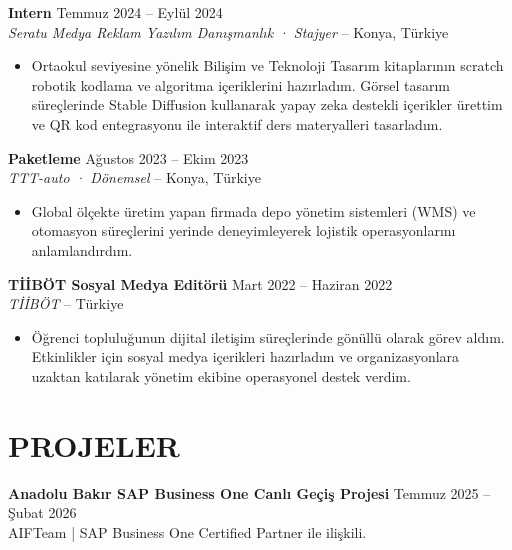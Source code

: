 \documentclass[a4paper,8pt]{article}
\begin{document}
\vspace{3pt}

\textbf{Intern} \hfill {\small Temmuz 2024 -- Eylül 2024}\\
{\small \textit{Seratu Medya Reklam Yazılım Danışmanlık · Stajyer} -- Konya, Türkiye}
\begin{itemize}
\item {\small Ortaokul seviyesine yönelik Bilişim ve Teknoloji Tasarım kitaplarının scratch robotik kodlama ve algoritma içeriklerini hazırladım. Görsel tasarım süreçlerinde Stable Diffusion kullanarak yapay zeka destekli içerikler ürettim ve QR kod entegrasyonu ile interaktif ders materyalleri tasarladım.}
\end{itemize}

\vspace{3pt}

\textbf{Paketleme} \hfill {\small Ağustos 2023 -- Ekim 2023}\\
{\small \textit{TTT-auto · Dönemsel} -- Konya, Türkiye}
\begin{itemize}
\item {\small Global ölçekte üretim yapan firmada depo yönetim sistemleri (WMS) ve otomasyon süreçlerini yerinde deneyimleyerek lojistik operasyonlarını anlamlandırdım.}
\end{itemize}

\vspace{3pt}

\textbf{TİİBÖT Sosyal Medya Editörü} \hfill {\small Mart 2022 -- Haziran 2022}\\
{\small \textit{TİİBÖT} -- Türkiye}
\begin{itemize}
\item {\small Öğrenci topluluğunun dijital iletişim süreçlerinde gönüllü olarak görev aldım. Etkinlikler için sosyal medya içerikleri hazırladım ve organizasyonlara uzaktan katılarak yönetim ekibine operasyonel destek verdim.}
\end{itemize}

\section{PROJELER}

\textbf{Anadolu Bakır SAP Business One Canlı Geçiş Projesi} \hfill {\small Temmuz 2025 -- Şubat 2026}\\
{\small AIFTeam | SAP Business One Certified Partner ile ilişkili.}

\vspace{3pt}
\end{document}
